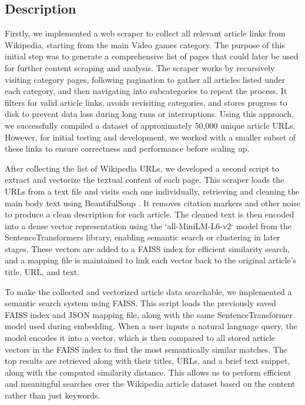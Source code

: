 \documentclass[fleqn,moreauthors,10pt]{ds_report}
\begin{document}
\subsection*{Description}
Firstly, we implemented a web scraper to collect all relevant article links from Wikipedia, starting from the main Video games category. The purpose of this initial step was to generate a comprehensive list of pages that could later be used for further content scraping and analysis. The scraper works by recursively visiting category pages, following pagination to gather all articles listed under each category, and then navigating into subcategories to repeat the process. It filters for valid article links, avoids revisiting categories, and stores progress to disk to prevent data loss during long runs or interruptions. Using this approach, we successfully compiled a dataset of approximately 50,000 unique article URLs. However, for initial testing and development, we worked with a smaller subset of these links to ensure correctness and performance before scaling up.

After collecting the list of Wikipedia URLs, we developed a second script to extract and vectorize the textual content of each page. This scraper loads the URLs from a text file and visits each one individually, retrieving and cleaning the main body text using BeautifulSoup \cite{soup}. It removes citation markers and other noise to produce a clean description for each article. The cleaned text is then encoded into a dense vector representation using the `all-MiniLM-L6-v2` model from the SentenceTransformers \cite{sentence} library, enabling semantic search or clustering in later stages. These vectors are added to a FAISS \cite{faiss} index for efficient similarity search, and a mapping file is maintained to link each vector back to the original article’s title, URL, and text.

To make the collected and vectorized article data searchable, we implemented a semantic search system using FAISS. This script loads the previously saved FAISS index and JSON mapping file, along with the same SentenceTransformer model used during embedding. When a user inputs a natural language query, the model encodes it into a vector, which is then compared to all stored article vectors in the FAISS index to find the most semantically similar matches. The top results are retrieved along with their titles, URLs, and a brief text snippet, along with the computed similarity distance. This allows us to perform efficient and meaningful searches over the Wikipedia article dataset based on the content rather than just keywords.
\end{document}
